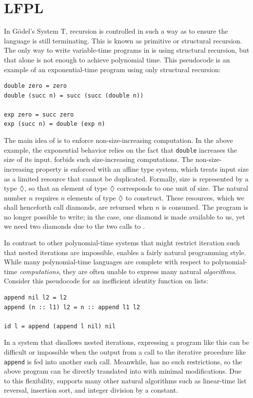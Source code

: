 \section{LFPL}
\label{sec:lfpl}

In G\"odel's System T, recursion is controlled in such a way as to ensure the language is still terminating. This is known as primitive or structural recursion. 
The only way to write variable-time programs in \lfpl is using structural recursion, but that alone is not enough to achieve polynomial time. This pseudocode is an example of an exponential-time program using only structural recursion:
\begin{lstlisting}
double zero = zero
double (succ n) = succ (succ (double n))

exp zero = succ zero
exp (succ n) = double (exp n)
\end{lstlisting}

The main idea of \lfpl is to enforce non-size-increasing computation. In the above example, the exponential behavior relies on the fact that \lstinline{double} increases the size of its input. \lfpl forbids such size-increasing computations. The non-size-increasing property is enforced with an affine type system, which treats input size as a limited resource that cannot be duplicated. Formally, size is represented by a type $\tpdiam$, so that an element of type $\tpdiam$ corresponds to one unit of size. The natural number $n$ requires $n$ elements of type $\tpdiam$ to construct. These resources, which we shall henceforth call diamonds, are returned when $n$ is consumed. The program  is no longer possible to write; in the  case, one diamond is made available to us, yet we need two diamonds due to the two calls to .

In contrast to other polynomial-time systems that might restrict iteration such that nested iterations are impossible, \lfpl enables a fairly natural programming style. While many polynomial-time languages are complete with respect to polynomial-time \textit{computations}, they are often unable to express many natural \textit{algorithms}. Consider this pseudocode for an inefficient identity function on lists:
\begin{lstlisting}
append nil l2 = l2
append (n :: l1) l2 = n :: append l1 l2

id l = append (append l nil) nil
\end{lstlisting}
In a system that disallows nested iterations, expressing a program like this can be difficult or impossible when the output from a call to the iterative procedure like \lstinline{append} is fed into another such call. Meanwhile, \lfpl has no such restrictions, so the above program can be directly translated into \lfpl with minimal modifications. Due to this flexibility, \lfpl supports many other natural algorithms such as linear-time list reversal, insertion sort, and integer division by a constant.



